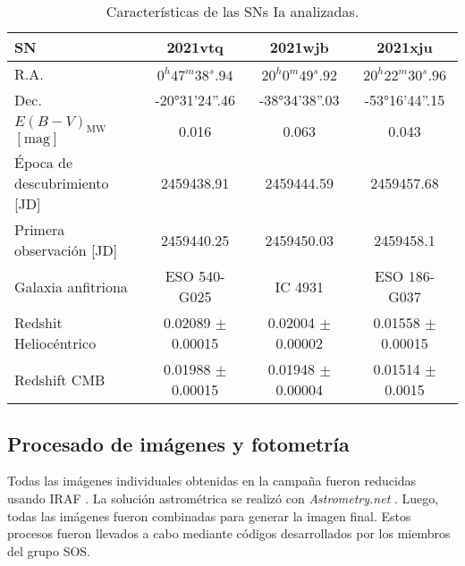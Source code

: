 \documentclass[baaa]{baaa}
\begin{document}
\begin{table*}[t]
\centering
\fontsize{9}{10}\selectfont
\caption{Características de las SNs Ia analizadas.}

\begin{tabular}{lccc}
\hline\hline\noalign{\smallskip}
SN                                                                               & 2021vtq         & 2021wjb         & 2021xju         \\ \hline
R.A.                                                                             & $0^h 47^m 38^s.94$     & $20^h0^m49^s.92$     & $20^h22^m30^s.96$    \\
Dec.                                                                             & -20°31'24''.46 & -38°34'38''.03 & -53°16'44''.15 \\
$E(B-V)_{\mathrm{MW}}$ $[\mathrm{mag}]$ & 0.016 & 0.063  &  0.043 \\
Época de descubrimiento {[}JD{]}                                                 & 2459438.91      & 2459444.59      & 2459457.68      \\
Primera observación {[}JD{]} & 2459440.25      & 2459450.03      & 2459458.1       \\
Galaxia anfitriona                                                                  & ESO 540-G025    & IC 4931         & ESO 186-G037    \\
Redshit Heliocéntrico                                                            & 0.02089 $\pm$ 0.00015 & 0.02004 $\pm$ 0.00002 & 0.01558 $\pm$ 0.00015 \\
Redshift CMB                                                                     & 0.01988 $\pm$ 0.00015 & 0.01948 $\pm$ 0.00004 & 0.01514 $\pm$ 0.0015  \\ \hline
\end{tabular}

\label{t:SNs}
\end{table*}
\subsection{Procesado de imágenes y fotometría} \label{sec:fotometria}
Todas las imágenes individuales obtenidas en la campaña fueron reducidas usando {\sc IRAF} \citep{IRAF}. La solución astrométrica se realizó con {\em Astrometry.net} \citep{Astrometry}. Luego, todas las imágenes fueron combinadas para generar la imagen final. Estos procesos fueron llevados a cabo mediante códigos desarrollados por los miembros del grupo SOS.
\end{document}
